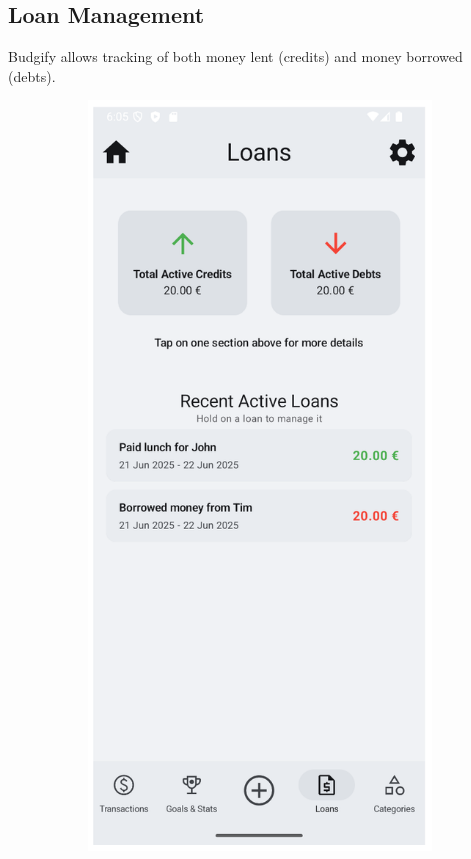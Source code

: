 \documentclass[a4paper,12pt]{article}
\begin{document}
\subsection{Loan Management}
Budgify allows tracking of both money lent (credits) and money borrowed (debts).

\begin{figure}[H]
    \centering
    \begin{subfigure}[b]{0.23\textwidth}
        \includegraphics[width=\textwidth]{loans.png}

\end{subfigure}
\end{figure}
\end{document}
